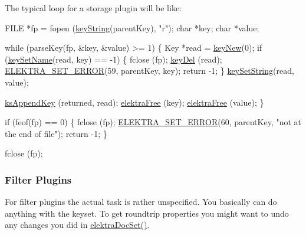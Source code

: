 The typical loop for a storage plugin will be like\+:


\begin{DoxyCodeInclude}
        FILE *fp = fopen (\hyperlink{group__keyvalue_ga880936f2481d28e6e2acbe7486a21d05}{keyString}(parentKey), \textcolor{stringliteral}{"r"});
        \textcolor{keywordtype}{char} *key;
        \textcolor{keywordtype}{char} *value;

        \textcolor{keywordflow}{while} (parseKey(fp, &key, &value) >= 1)
        \{
                Key *read = \hyperlink{group__key_gad23c65b44bf48d773759e1f9a4d43b89}{keyNew}(0);
                \textcolor{keywordflow}{if} (\hyperlink{group__keyname_ga7699091610e7f3f43d2949514a4b35d9}{keySetName}(read, key) == -1)
                \{
                        fclose (fp);
                        \hyperlink{group__key_ga3df95bbc2494e3e6703ece5639be5bb1}{keyDel} (read);
                        \hyperlink{group__plugin_gaab1842b82272e6d4235b6a71587a64d9}{ELEKTRA\_SET\_ERROR}(59, parentKey, key);
                        \textcolor{keywordflow}{return} -1;
                \}
                \hyperlink{group__keyvalue_ga622bde1eb0e0c4994728331326340ef2}{keySetString}(read, value);

                \hyperlink{group__keyset_gaa5a1d467a4d71041edce68ea7748ce45}{ksAppendKey} (returned, read);
                \hyperlink{internal_8c_a7f572149d2e0bfe18023a6ac969f195c}{elektraFree} (key);
                \hyperlink{internal_8c_a7f572149d2e0bfe18023a6ac969f195c}{elektraFree} (value);
        \}

        \textcolor{keywordflow}{if} (feof(fp) == 0)
        \{
                fclose (fp);
                \hyperlink{group__plugin_gaab1842b82272e6d4235b6a71587a64d9}{ELEKTRA\_SET\_ERROR}(60, parentKey, \textcolor{stringliteral}{"not at the end of file"});
                \textcolor{keywordflow}{return} -1;
        \}

        fclose (fp);
\end{DoxyCodeInclude}
 \hypertarget{group__plugin_filter}{}\subsubsection{Filter Plugins}\label{group__plugin_filter}
For filter plugins the actual task is rather unspecified. You basically can do anything with the keyset. To get roundtrip properties you might want to undo any changes you did in \hyperlink{group__plugin_gae65781a1deb34efc79c8cb9d9174842c}{elektra\+Doc\+Set()}.

